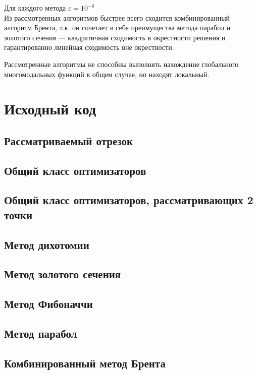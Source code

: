 Для каждого метода $\varepsilon = 10^{-6}$\\

Из рассмотренных алгоритмов быстрее всего сходится комбинированный алгоритм Брента, т.к. он сочетает в себе преимущества метода парабол и золотого сечения --- квадратичная сходимость в окрестности решения и гарантированно линейная сходимость вне окрестности.

Рассмотренные алгоритмы не способны выполнять нахождение глобального многомодальных функций в общем случае, но находят локальный.

\newpage
\section{Исходный код}

\subsection{Рассматриваемый отрезок}

\subsection{Общий класс оптимизаторов}
\newpage

\subsection{Общий класс оптимизаторов, рассматривающих 2 точки}
\newpage

\subsection{Метод дихотомии}
\newpage

\subsection{Метод золотого сечения}
\newpage

\subsection{Метод Фибоначчи}
\newpage

\subsection{Метод парабол}

\subsection{Комбинированный метод Брента}



